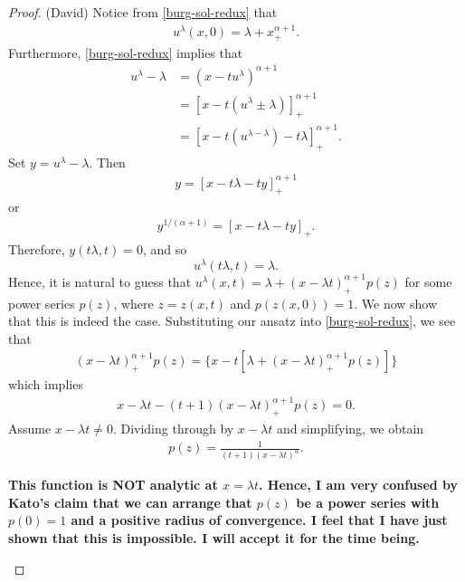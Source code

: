 \documentclass[12pt,reqno]{amsart}
\numberwithin{equation}{section}  %
\numberwithin{figure}{section}
\begin{document}
\begin{proof}(David)
Notice from \eqref{burg-sol-redux} that
%
%
\begin{equation*}
\begin{split}
u^{\lambda}(x, 0) = \lambda + x_{+}^{\alpha +1}.
\end{split}
\end{equation*}
%
%
Furthermore, \eqref{burg-sol-redux} implies that
%
%
%
%
\begin{equation*}
\begin{split}
u^{\lambda} - \lambda
& = (x - tu^{\lambda})^{\alpha + 1}
\\
& = [x - t(u^{\lambda} \pm \lambda)]^{\alpha + 1}_{+}
\\
& = [x - t(u^{\lambda - \lambda}) - t \lambda]_{+}^{\alpha + 1}.
\end{split}
\end{equation*}
%
%
Set $y = u^{\lambda} - \lambda$. Then
%
%
\begin{equation*}
\begin{split}
y = [x - t \lambda - ty]_{+}^{\alpha + 1}
\end{split}
\end{equation*}
%
%
or
%
%
\begin{equation*}
\begin{split}
y^{1/(\alpha + 1)} = [x - t \lambda - ty]_{+}.
\end{split}
\end{equation*}
%
%
Therefore, $y(t \lambda, t) = 0$, and so $$u^{\lambda}(t \lambda, t) = \lambda.$$
%
%
Hence, it is natural to guess that $u^{\lambda}(x,t) = \lambda + (x - \lambda
t)^{\alpha + 1}_{+} p(z)$ for some power series $p(z)$, where $z = z(x,t)$ and
$p(z(x,0)) =1$. We now show that this is indeed the case. Substituting our ansatz
into \eqref{burg-sol-redux}, we see that
%
%
\begin{equation*}
\begin{split}
(x - \lambda t)^{\alpha + 1}_{+} p(z) = \{x - t[\lambda + (x - \lambda
    t)_{+}^{\alpha +1} p(z)]\} 
\end{split}
\end{equation*}
%
%
which implies
%
%
\begin{equation*}
\begin{split}
x - \lambda t - (t + 1)(x - \lambda t)_{+}^{\alpha + 1} p(z) = 0.
\end{split}
\end{equation*}
%
%
Assume $x - \lambda t \neq 0$. Dividing through by $x - \lambda t$ and simplifying, we obtain
%
%
\begin{equation*}
\begin{split}
p(z) =\frac{1}{(t+1)(x - \lambda t)^{\alpha}}.
\end{split}
\end{equation*}
%
%
%
\begin{framed}
    \textbf{This function is NOT analytic at $x = \lambda t$. 
    Hence, I am very confused by Kato's claim that we can arrange that $p(z)$ be a
    power series with $p(0)=1$ and a positive radius of convergence. I feel that
    I have just shown that this is impossible. I will accept it for the time
    being.}
\end{framed}
%
%
%
\end{proof}
\end{document}
